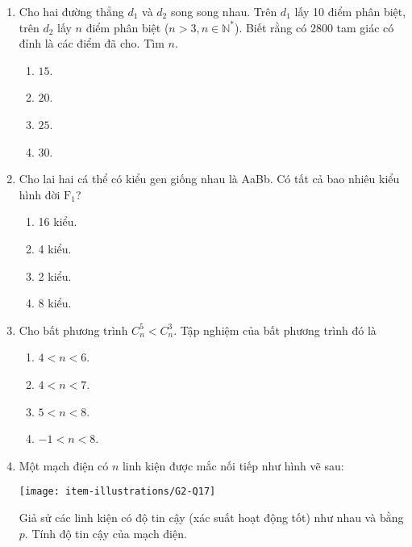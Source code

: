 \begin{enumerate}[label=\textbf{Câu \arabic*.},align=left,left=0cm..0cm,itemindent=*]
\begin{multicols}{4}
\begin{enumerate}[label=\textbf{\Alph*.},align=left,left=1cm..0cm,itemindent=*]
	\end{enumerate}\end{multicols}
	\item Cho hai đường thẳng $d_1$ và $d_2$ song song nhau. Trên $d_1$ lấy 10 điểm phân biệt, trên $d_2$ lấy $n$ điểm phân biệt ($n>3,n\in\mathbb{N}^{*}$). Biết rằng có 2800 tam giác có đỉnh là các điểm đã cho. Tìm $n$.
	\begin{multicols}{4}\begin{enumerate}[label=\textbf{\Alph*.},align=left,left=1cm..0cm,itemindent=*]
		\item $15$. \item $20$. \item $25$. \item $30$.
	\end{enumerate}\end{multicols}
	\item Cho lai hai cá thể có kiểu gen giống nhau là AaBb. Có tất cả bao nhiêu kiểu hình đời $\text{F}_1$?
	\begin{multicols}{4}\begin{enumerate}[label=\textbf{\Alph*.},align=left,left=1cm..0cm,itemindent=*]
		\item 16 kiểu. \item 4 kiểu. \item 2 kiểu. \item 8 kiểu.
	\end{enumerate}\end{multicols}
	\item Cho bất phương trình $C_{n}^{5}<C_{n}^{3}$. Tập nghiệm của bất phương trình đó là
	\begin{enumerate}[label=\textbf{\Alph*.},align=left,left=1cm..0cm,itemindent=*]
		\item $4<n<6$. \item $4<n<7$. \item $5<n<8$. \item $-1<n<8$.
	\end{enumerate}
	\item Một mạch điện có $n$ linh kiện được mắc nối tiếp như hình vẽ sau:\par
	{\centering\texttt{[image: item-illustrations/G2-Q17]}\par}
	Giả sử các linh kiện có độ tin cậy (xác suất hoạt động tốt) như nhau và bằng $p$. Tính độ tin cậy của mạch điện.
	\begin{multicols}{4}\begin{enumerate}[label=\textbf{\Alph*.},align=left,left=1cm..0cm,itemindent=*]

\end{enumerate}
\end{multicols}
\end{enumerate}

